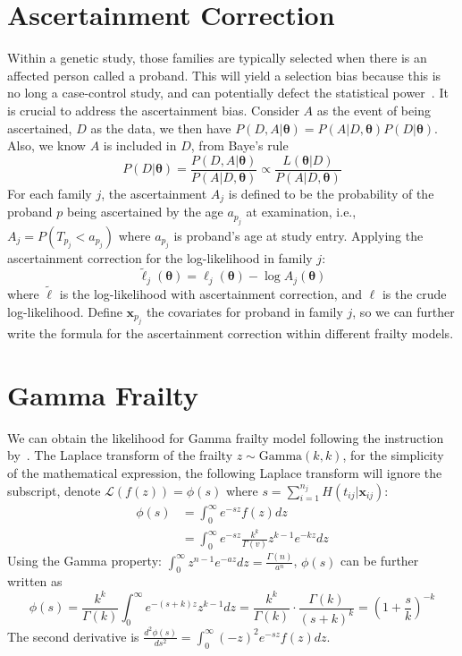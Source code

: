 \documentclass[preprint,12pt]{elsarticle}
\begin{document}
\section{Ascertainment Correction} 
Within a genetic study, those families are typically selected when there is an affected person called a proband. This will yield a selection bias because this is no long a case-control study, and can potentially defect the statistical power~\cite{park2015adjusting, clark2005ascertainment}.
It is crucial to address the ascertainment bias. Consider $A$ as the event of being ascertained, $D$ as the data, we then have $P(D, A|\boldsymbol{\theta})=P(A|D,\boldsymbol{\theta})P(D|\boldsymbol{\theta})$. 
Also, we know $A$ is included in $D$, from Baye's rule
\begin{equation} 
    P(D|\boldsymbol{\theta})= \frac{P(D,A|\boldsymbol{\theta})}{P(A|D, \boldsymbol{\theta})}\propto\frac{L(\boldsymbol{\theta}|D)}{P(A|D,\boldsymbol{\theta})}
\end{equation}
For each family $j$, the ascertainment $A_j$ is defined to be the probability of the proband $p$ being ascertained by the age $a_{p_j}$ at examination, i.e., $A_j=P(T_{p_j} < a_{p_j})$ where $a_{p_j}$ is proband's age at study entry. Applying the ascertainment correction for the log-likelihood in family $j$: 
\begin{equation}
    \tilde{\ell}_{j}(\boldsymbol{\theta})=\ell_j(\boldsymbol{\theta})-\log A_j(\boldsymbol{\theta})
\end{equation}
where $\tilde{\ell}$ is the log-likelihood with ascertainment correction, and $\ell$ is the crude log-likelihood. 
Define $\mathbf{x}_{p_j}$ the covariates for proband in family $j$, so we can further write the formula for the ascertainment correction within different frailty models. 

\section{Gamma Frailty}\label{sec:gammafr}
We can obtain the likelihood for Gamma frailty model following the instruction by~\citet{balan2020tutorial}. 
The Laplace transform of the frailty $z\sim\text{Gamma}(k, k)$, for the simplicity of the mathematical expression, the following Laplace transform will ignore the subscript, denote $\mathscr{L}(f(z))=\phi(s)$ where $s=\sum_{i=1}^{n_j}H(t_{ij}|\mathbf{x}_{ij})$:
\begin{align}
    \phi(s)&=\int_0^{\infty}e^{-sz}f(z)dz\\
    &=\int_0^{\infty}e^{-sz}\frac{k^k}{\Gamma(v)}z^{k-1}e^{-kz}dz
\end{align}
Using the Gamma property: $\int_0^{\infty}z^{n-1}e^{-az}dz=\frac{\Gamma(n)}{a^n}$, $\phi(s)$ can be further written as
\begin{equation}
    \phi(s)=\frac{k^k}{\Gamma(k)}\int_0^{\infty}e^{-(s+k)z}z^{k-1}dz=\frac{k^k}{\Gamma(k)}\cdot \frac{\Gamma(k)}{(s+k)^k}=(1+\frac{s}{k})^{-k}
\end{equation}
The second derivative is $\frac{d^2\phi(s)}{ds^2}=\int_0^{\infty}(-z)^2e^{-sz}f(z)dz$. 
\end{document}
